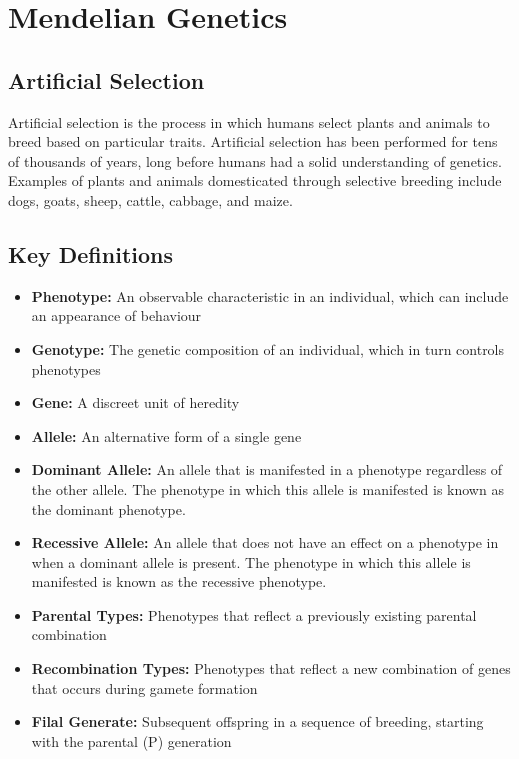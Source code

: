 \documentclass[12pt,titlepage]{article}
\begin{document}
    \section{Mendelian Genetics}
      \subsection{Artificial Selection}
        Artificial selection is the process in which humans select plants and animals to breed based 
        on particular traits. Artificial selection has been performed for tens of thousands of years,
        long before humans had a solid understanding of genetics. Examples of plants and animals domesticated
        through selective breeding include dogs, goats, sheep, cattle, cabbage, and maize.

      \subsection{Key Definitions}
        \begin{itemize}
          \item \textbf{Phenotype:} An observable characteristic in an individual, which can include an appearance of behaviour
          \item \textbf{Genotype:} The genetic composition of an individual, which in turn controls phenotypes
          \item \textbf{Gene:} A discreet unit of heredity
          \item \textbf{Allele:} An alternative form of a single gene
          \item \textbf{Dominant Allele:} An allele that is manifested in a phenotype regardless of the other allele.
          The phenotype in which this allele is manifested is known as the dominant phenotype.
          \item \textbf{Recessive Allele:} An allele that does not have an effect on a phenotype in when a dominant allele is present.
          The phenotype in which this allele is manifested is known as the recessive phenotype.
          \item \textbf{Parental Types:} Phenotypes that reflect a previously existing parental combination
          \item \textbf{Recombination Types:} Phenotypes that reflect a new combination of genes that occurs during gamete formation
          \item \textbf{Filal Generate:} Subsequent offspring in a sequence of breeding, starting with the parental (P) generation
        \end{itemize}
\end{document}
